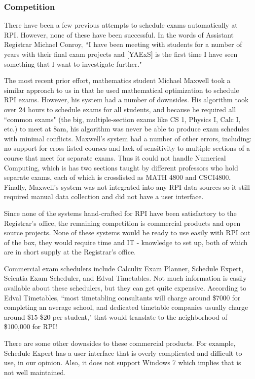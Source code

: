 \documentclass[11pt]{article}
\begin{document}
\subsubsection*{Competition}
There have been a few previous attempts to schedule exams automatically at RPI. However, none of these have been successful.  In the words of Assistant Registrar Michael Conroy,  ``I have been meeting with students for a number of years with their final exam projects and [YAExS] is the first time I have seen something that I want to investigate further."

The most recent prior effort,  mathematics student Michael Maxwell took a similar approach to us in that he used mathematical optimization to schedule RPI exams. 
However, his system had a number of downsides. 
His algorithm took over 24 hours to  schedule exams for all students, and because he required all ``common exams" (the big, multiple-section exams like CS 1, Physics I, Calc I, etc.) to meet at 8am, his algorithm was never be able to produce exam schedules with minimal conflicts. 
Maxwell's system had a number of other errors, including: no support for cross-listed courses and lack of sensitivity to multiple sections of a course that meet for separate exams. Thus it could not handle Numerical Computing, which is has two sections taught by different professors who hold separate exams, each of which is crosslisted as MATH 4800 and CSCI4800.
Finally, Maxwell's system was not integrated into any RPI data sources so it still required manual data collection and did not have a user interface. 

Since none of the systems hand-crafted for RPI have been satisfactory to the Registrar's office, the remaining competition is commercial products and open source projects. 
None of these systems would be ready to use easily with RPI out of the box, they would require time and IT - knowledge to set up, both of which are in short supply at the Registrar's office.

Commercial exam schedulers include Calculix Exam Planner, Schedule Expert, Scientia Exam Scheduler, and Edval Timetables. Not much information is easily available about these schedulers, but they can get quite expensive. 
According to Edval Timetables, ``most timetabling consultants will charge around \$7000 for completing an average school, and dedicated timetable companies usually charge around \$15-\$20 per student," that would translate to the neighborhood of \$100,000 for RPI!

There are some other downsides to these commercial products.
For example, Schedule Expert has a user interface that is overly complicated and difficult to use, in our opinion.  
Also, it does not support Windows 7 which implies that is not well maintained.
\end{document}
